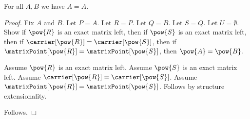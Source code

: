 

\begin{proposition}\label{exact_record_alias_normalization}
    For all $A,B$ we have $A=A$.
\end{proposition}
\begin{proof}
    Fix $A$ and $B$.
    Let $P=A$.
    Let $R=P$.
    Let $Q=B$.
    Let $S=Q$.
    Let $U=\emptyset$.
    Show if $\pow{R}$ is an exact matrix left, then if
        $\pow{S}$ is an exact matrix left, then if
        $\carrier[\pow{R}]=\carrier[\pow{S}]$, then if
        $\matrixPoint[\pow{R}]=\matrixPoint[\pow{S}]$, then
        $\pow{A}=\pow{B}$.
    \begin{subproof}
        Assume $\pow{R}$ is an exact matrix left.
        Assume $\pow{S}$ is an exact matrix left.
        Assume $\carrier[\pow{R}]=\carrier[\pow{S}]$.
        Assume $\matrixPoint[\pow{R}]=\matrixPoint[\pow{S}]$.
        Follows by structure extensionality.
    \end{subproof}
    Follows.
\end{proof}
